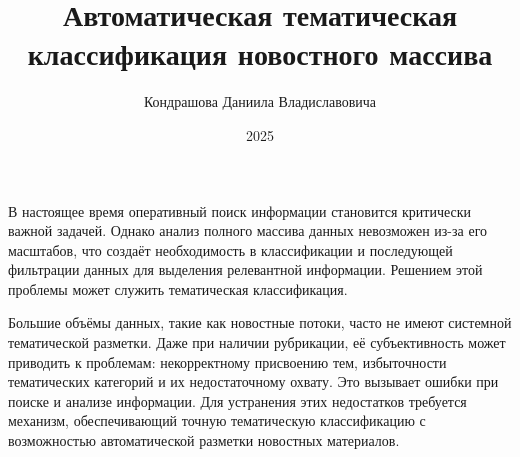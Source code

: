\documentclass[autoref]{SCWorks}
\begin{document}

\title{Автоматическая тематическая классификация новостного массива}





\author{Кондрашова Даниила Владиславовича}




\date{2025}
\maketitle
\secNumbering
\intro
В настоящее время оперативный поиск информации становится критически важной
задачей. Однако анализ полного массива данных невозможен из-за его масштабов,
что создаёт необходимость в классификации и последующей фильтрации данных для
выделения релевантной информации. Решением этой проблемы может служить
тематическая классификация.

Большие объёмы данных, такие как новостные потоки, часто не имеют системной
тематической разметки. Даже при наличии рубрикации, её субъективность может
приводить к проблемам: некорректному присвоению тем, избыточности тематических
категорий и их недостаточному охвату. Это вызывает ошибки при поиске и анализе
информации. Для устранения этих недостатков требуется механизм, обеспечивающий
точную тематическую классификацию с возможностью автоматической разметки
новостных материалов.
\end{document}
